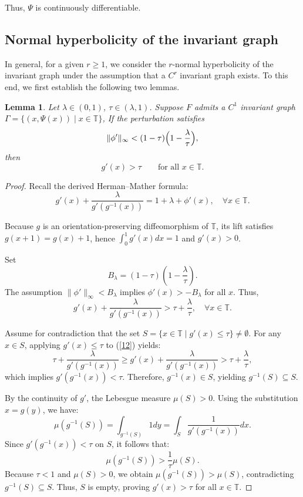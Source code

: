 \documentclass{amsart}
\newtheorem{Lemma}[Definition]{Lemma}
\begin{document}
	Thus, $\Psi$ is continuously differentiable.
	
	
	\subsection{Normal hyperbolicity of the invariant graph}In general, for a given \( r \geq 1 \), we consider the \( r \)-normal hyperbolicity of the invariant graph under the assumption that a \( C^r \) invariant graph exists. To this end, we first establish the following two lemmas.
	
	
	
	
	
	
	
	
	\begin{Lemma}\label{lem:universal-g-lower}
		Let $\lambda\in(0,1)$, $\tau\in(\lambda,1)$.
		Suppose $F$ admits a $C^1$ invariant graph $\Gamma=\{(x,\Psi(x))\mid x\in\mathbb{T}\}$,
		If the perturbation satisfies
		\[
		\|\phi'\|_\infty < (1-\tau)\Bigl(1-\frac{\lambda}{\tau}\Bigr),
		\]
		then
		\[
		g'(x) > \tau \qquad \text{for all } x\in\mathbb{T}.
		\]
	\end{Lemma}
	
	\begin{proof}
		Recall the derived Herman--Mather formula:
		\begin{equation}\tag{A'}
			g'(x) + \frac{\lambda}{g'(g^{-1}(x))} = 1 + \lambda + \phi'(x), \quad \forall x \in \mathbb{T}.
		\end{equation}
		
		Because $g$ is an orientation-preserving diffeomorphism of $\mathbb{T}$, its lift satisfies $g(x + 1) = g(x) + 1$, hence $\int_0^1 g'(x) dx = 1$ and $g'(x) > 0$.
		
		Set
		$$ B_\lambda = (1 - \tau)\left(1 - \frac{\lambda}{\tau}\right). $$
		The assumption $\|\phi'\|_\infty < B_\lambda$ implies $\phi'(x) > -B_\lambda$ for all $x$. Thus,
		\begin{equation}\label{12}
			g'(x) + \frac{\lambda}{g'(g^{-1}(x))} > \tau + \frac{\lambda}{\tau}, \quad \forall x \in \mathbb{T}.
		\end{equation}
		
		Assume for contradiction that the set $S = \{x \in \mathbb{T} \mid g'(x) \le \tau\} \neq \emptyset$.
		For any $x \in S$, applying $g'(x) \le \tau$ to (\ref{12}) yields:
		$$
		\tau + \frac{\lambda}{g'(g^{-1}(x))} \ge g'(x) + \frac{\lambda}{g'(g^{-1}(x))} > \tau + \frac{\lambda}{\tau},
		$$
		which implies $g'(g^{-1}(x)) < \tau$. Therefore, $g^{-1}(x) \in S$, yielding $g^{-1}(S) \subseteq S$.
		
		By the continuity of $g'$, the Lebesgue measure $\mu(S) > 0$.
		Using the substitution $x = g(y)$, we have:
		$$
		\mu(g^{-1}(S)) = \int_{g^{-1}(S)} 1 dy = \int_S \frac{1}{g'(g^{-1}(x))} dx.
		$$
		Since $g'(g^{-1}(x)) < \tau$ on $S$, it follows that:
		$$
		\mu(g^{-1}(S)) > \frac{1}{\tau} \mu(S).
		$$
		Because $\tau < 1$ and $\mu(S) > 0$, we obtain $\mu(g^{-1}(S)) > \mu(S)$, contradicting $g^{-1}(S) \subseteq S$.
		Thus, $S$ is empty, proving $g'(x) > \tau$ for all $x \in \mathbb{T}$.
	\end{proof}
	
\end{document}
